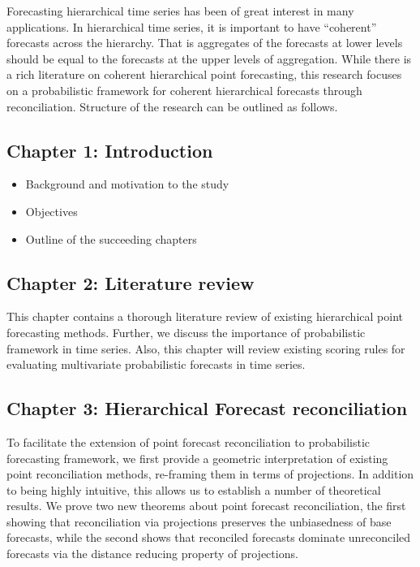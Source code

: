 Forecasting hierarchical time series has been of great interest in many applications. In hierarchical time series, it is important to have ``coherent'' forecasts across the hierarchy. That is aggregates of the forecasts at lower levels should be equal to the forecasts at the upper levels of aggregation. While there is a rich literature on coherent hierarchical point forecasting, this research focuses on a probabilistic framework for coherent hierarchical forecasts through reconciliation. Structure of the research can be outlined as follows.    

\subsection*{Chapter 1: Introduction}
\begin{itemize}
	\item Background and motivation to the study
	\item Objectives
	\item Outline of the succeeding chapters
\end{itemize}

\subsection*{Chapter 2: Literature review}
  	
  	This chapter contains a thorough literature review of existing hierarchical point forecasting methods. Further, we discuss the importance of probabilistic framework in time series. Also, this chapter will review existing scoring rules for evaluating multivariate probabilistic forecasts in time series. 
  	
  

\subsection*{Chapter 3: Hierarchical Forecast reconciliation}

To facilitate the extension of point forecast reconciliation to probabilistic forecasting framework, we first provide a geometric interpretation of existing point reconciliation methods, re-framing them in terms of projections. In addition to being highly intuitive, this allows us to establish a number of theoretical results. We prove two new theorems about point forecast reconciliation, the first showing that reconciliation via projections preserves the unbiasedness of base forecasts, while the second shows that reconciled forecasts dominate unreconciled forecasts via the distance reducing property of projections. 

